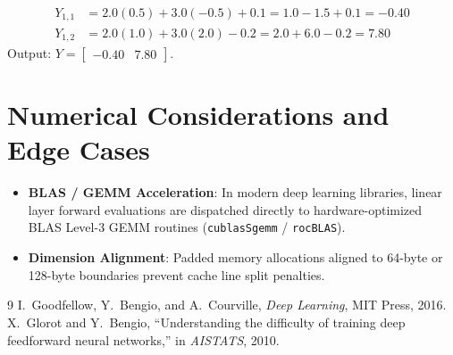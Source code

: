 \documentclass[11pt,a4paper]{article}
\theoremstyle{definition}
\begin{document}
\begin{align}
Y_{1, 1} &= 2.0(0.5) + 3.0(-0.5) + 0.1 = 1.0 - 1.5 + 0.1 = -0.40 \\
Y_{1, 2} &= 2.0(1.0) + 3.0(2.0) - 0.2 = 2.0 + 6.0 - 0.2 = 7.80
\end{align}
Output: $Y = \begin{bmatrix} -0.40 & 7.80 \end{bmatrix}$.

\section{Numerical Considerations and Edge Cases}

\begin{itemize}
    \item \textbf{BLAS / GEMM Acceleration}: In modern deep learning libraries, linear layer forward evaluations are dispatched directly to hardware-optimized BLAS Level-3 GEMM routines (\texttt{cublasSgemm} / \texttt{rocBLAS}).
    \item \textbf{Dimension Alignment}: Padded memory allocations aligned to 64-byte or 128-byte boundaries prevent cache line split penalties.
\end{itemize}

\begin{thebibliography}{9}
 I.~Goodfellow, Y.~Bengio, and A.~Courville, \emph{Deep Learning}, MIT Press, 2016.
 X.~Glorot and Y.~Bengio, ``Understanding the difficulty of training deep feedforward neural networks,'' in \emph{AISTATS}, 2010.
\end{thebibliography}
\end{document}
